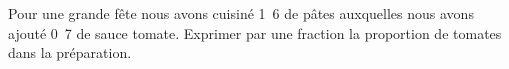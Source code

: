 
\begin{exercice}\label{exosmath-0803}

    Pour une grande fête nous avons cuisiné \unit{1.6}{\kilo\gram} de pâtes auxquelles nous avons ajouté \unit{0.7}{\kilo\gram} de sauce tomate. Exprimer par une fraction la proportion de tomates dans la préparation.

\end{exercice}
